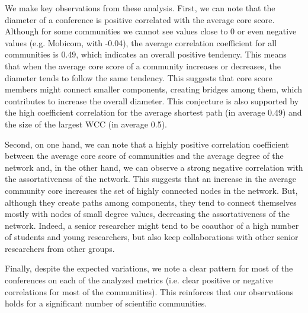 We make key observations from these analysis. First, we can note that the diameter of a conference is positive correlated with the average core score. Although for some communities
we cannot see values close to 0 or even negative values (e.g. Mobicom, with -0.04), the average correlation coefficient for all communities is 0.49, which indicates an overall
positive tendency. This means that when the average core score of a community increases or decreases, the diameter tends to follow the same tendency. This suggests that core score
members might connect smaller components, creating bridges among them, which contributes to increase the overall diameter. This conjecture is also supported by the high coefficient
correlation for the average shortest path (in average 0.49) and the size of the largest WCC (in average 0.5).

Second, on one hand, we can note that a highly positive correlation coefficient between the average core score of communities and the average degree of the network and, in the
other hand, we can 
observe a strong negative correlation with the assortativeness of the network. This suggests that an increase in the average community core increases the set of highly connected
nodes in the network. But, although they create paths among components, they tend to connect themselves mostly with nodes of small degree values, decreasing the assortativeness of the
network. Indeed, a senior researcher might tend to be coauthor of a high number of students and young researchers, but also keep collaborations with other senior researchers from
other groups.

Finally, despite the expected variations, we note a clear pattern for most of the conferences on each of the analyzed metrics (i.e. clear positive or negative correlations for most of the
communities). This reinforces that our observations holds for a significant number of scientific communities. 



